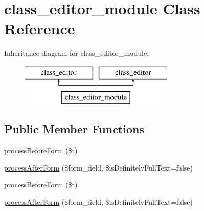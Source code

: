 \hypertarget{classclass__editor__module}{\section{class\-\_\-editor\-\_\-module Class Reference}
\label{classclass__editor__module}
}
Inheritance diagram for class\-\_\-editor\-\_\-module\-:\begin{figure}[H]
\begin{center}
\leavevmode
\includegraphics[height=2.000000cm]{classclass__editor__module}
\end{center}
\end{figure}
\subsection*{Public Member Functions}
\begin{DoxyCompactItemize}
\item 
\hyperlink{classclass__editor__module_a379c4156c8287e24ee039d438b76e8cb}{process\-Before\-Form} (\$t)
\item 
\hyperlink{classclass__editor__module_afed803662e256b9c242eef7833ebe823}{process\-After\-Form} (\$form\-\_\-field, \$is\-Definitely\-Full\-Text=false)
\item 
\hyperlink{classclass__editor__module_a379c4156c8287e24ee039d438b76e8cb}{process\-Before\-Form} (\$t)
\item 
\hyperlink{classclass__editor__module_afed803662e256b9c242eef7833ebe823}{process\-After\-Form} (\$form\-\_\-field, \$is\-Definitely\-Full\-Text=false)
\end{DoxyCompactItemize}
